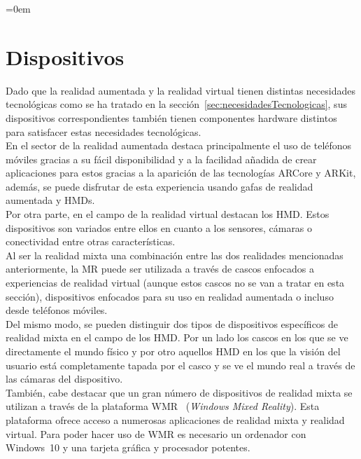 \parindent=0em
\section{Dispositivos}
\noindent

Dado que la realidad aumentada y la realidad virtual tienen distintas necesidades tecnológicas como se ha tratado en la sección~\ref{sec:necesidadesTecnologicas}, sus dispositivos correspondientes también tienen componentes hardware distintos para satisfacer estas necesidades tecnológicas.\\

En el sector de la realidad aumentada destaca principalmente el uso de teléfonos móviles gracias a su fácil disponibilidad y a la facilidad añadida de crear aplicaciones para estos gracias a la aparición de las tecnologías ARCore y ARKit, además, se puede disfrutar de esta experiencia usando gafas de realidad aumentada y HMDs.\\

Por otra parte, en el campo de la realidad virtual destacan los HMD. Estos dispositivos son variados entre ellos en cuanto a los sensores, cámaras o conectividad entre otras características.\\

Al ser la realidad mixta una combinación entre las dos realidades mencionadas anteriormente, la MR puede ser utilizada a través de cascos enfocados a experiencias de realidad virtual (aunque estos cascos no se van a tratar en esta sección), dispositivos enfocados para su uso en realidad aumentada o incluso desde teléfonos móviles.\\

Del mismo modo, se pueden distinguir dos tipos de dispositivos específicos de realidad mixta en el campo de los HMD. Por un lado los cascos en los que se ve directamente el mundo físico y por otro aquellos HMD en los que la visión del usuario está completamente tapada por el casco y se ve el mundo real a través de las cámaras del dispositivo.\\



También, cabe destacar que un gran número de dispositivos de realidad mixta se utilizan a través de la plataforma WMR\footnotemark~  (\textit{Windows Mixed Reality}). Esta plataforma ofrece acceso a numerosas aplicaciones de realidad mixta y realidad virtual. Para poder hacer uso de WMR es necesario un ordenador con Windows~10 y una tarjeta gráfica y procesador potentes.\\

